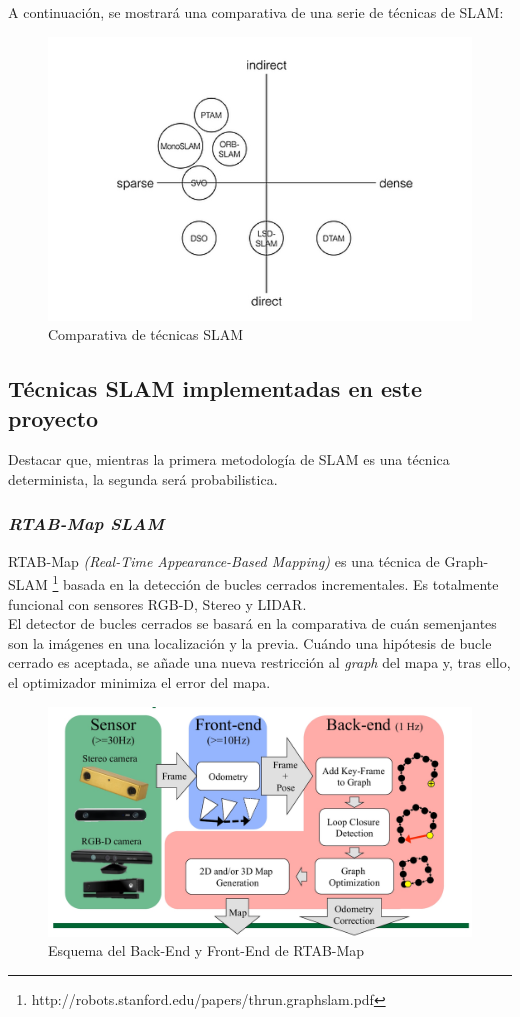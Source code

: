 \begin{itemize}
A continuación, se mostrará una comparativa de una serie de técnicas de SLAM:
\begin{figure}[h!]
    \centering
    \includegraphics[width=.6\textwidth]{images/comp_slam}
    \caption{Comparativa de técnicas SLAM}
\end{figure}

\end{itemize}

\subsection{Técnicas SLAM implementadas en este proyecto}
Destacar que, mientras la primera metodología de SLAM es una técnica determinista, la segunda será probabilistica.
\subsubsection{\textit{RTAB-Map SLAM}}
RTAB-Map \textit{(Real-Time Appearance-Based Mapping)} es una técnica de Graph-SLAM \footnote{http://robots.stanford.edu/papers/thrun.graphslam.pdf} basada en la detección de bucles cerrados incrementales. Es totalmente funcional 
con sensores RGB-D, Stereo y LIDAR. \\
El detector de bucles cerrados se basará en la comparativa de cuán semenjantes son la imágenes en una localización y la previa. Cuándo una hipótesis 
de bucle cerrado es aceptada, se añade una nueva restricción al \textit{graph} del mapa y, tras ello, el optimizador minimiza el error del mapa. \\

\begin{figure}[h!]
    \centering
    \includegraphics[width=.7\textwidth]{images/rtabmap_scheme}
    \caption{Esquema del Back-End y Front-End de RTAB-Map}
\end{figure}


